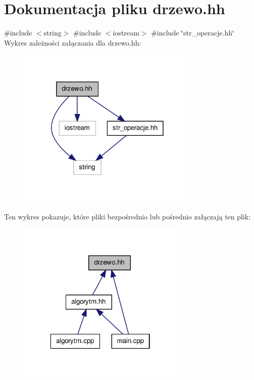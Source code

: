 \hypertarget{drzewo_8hh}{\section{\-Dokumentacja pliku drzewo.\-hh}
\label{drzewo_8hh}
}
{\ttfamily \#include $<$string$>$}\*
{\ttfamily \#include $<$iostream$>$}\*
{\ttfamily \#include \char`\"{}str\-\_\-operacje.\-hh\char`\"{}}\*
\-Wykres zależności załączania dla drzewo.\-hh\-:\nopagebreak
\begin{figure}[H]
\begin{center}
\leavevmode
\includegraphics[width=246pt]{drzewo_8hh__incl}
\end{center}
\end{figure}
\-Ten wykres pokazuje, które pliki bezpośrednio lub pośrednio załączają ten plik\-:\nopagebreak
\begin{figure}[H]
\begin{center}
\leavevmode
\includegraphics[width=226pt]{drzewo_8hh__dep__incl}
\end{center}
\end{figure}
